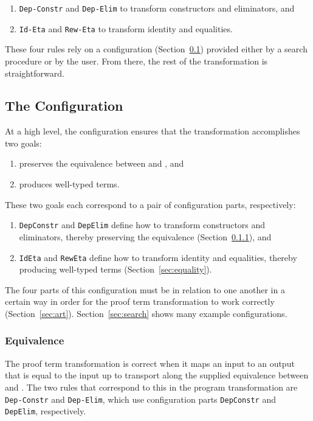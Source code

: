 \begin{enumerate}
\item \lstinline{Dep-Constr} and \lstinline{Dep-Elim} to transform constructors and eliminators, and
\item \lstinline{Id-Eta} and \lstinline{Rew-Eta} to transform identity and equalities.
\end{enumerate}
These four rules rely on a configuration (Section~\ref{sec:configurable}) %
provided either by a search procedure or by the user.
From there, the rest of the transformation is straightforward.

\subsection{The Configuration}
\label{sec:configurable}

At a high level, the configuration ensures that the transformation accomplishes two goals:

\begin{enumerate}
\item preserves the equivalence between \A and \B, and
\item produces well-typed terms.
\end{enumerate}
These two goals each correspond to a pair of configuration parts, respectively:

\begin{enumerate}
\item \lstinline{DepConstr} and \lstinline{DepElim} define how to transform constructors and eliminators, thereby preserving the equivalence (Section~\ref{sec:equivalence}), and 
\item \lstinline{IdEta} and \lstinline{RewEta} define how to transform identity and equalities, thereby producing well-typed terms (Section~\ref{sec:equality}).
\end{enumerate}

The four parts of this configuration must be in relation to one another in a certain way in order for the proof
term transformation to work correctly (Section~\ref{sec:art}).
Section~\ref{sec:search} shows many example configurations.

\subsubsection{Equivalence}
\label{sec:equivalence}

The proof term transformation is correct when it maps an input to an output that is equal
to the input up to transport along the supplied equivalence between \A and \B.
The two rules that correspond to this in the program transformation are \lstinline{Dep-Constr} and \lstinline{Dep-Elim},
which use configuration parts \lstinline{DepConstr} and \lstinline{DepElim}, respectively.

